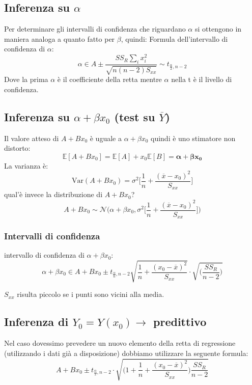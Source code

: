 \documentclass[]{article}
\newcommand{\ev}{\mathbb{E}[X]}
\renewcommand{\ev}[1]{\mathbb{E}\left[#1\right]}
\begin{document}
    \subsection{Inferenza su $\alpha$}
    Per determinare gli intervalli di confidenza che riguardano $\alpha$ si ottengono in maniera analoga a quanto fatto per $\beta$, quindi:
    Formula dell'intervallo di confidenza di $\alpha$:
    \[ \alpha \in A \pm \frac{SS_R\sum_{i}{}x_i^2}{\sqrt{n(n-2)S_{xx}}} \sim t_{\frac{\alpha}{2},n-2} \]
    Dove la prima $\alpha$ è il coefficiente della retta mentre $\alpha$ nella t è il livello di confidenza.
    \subsection{Inferenza su $\alpha + \beta x_0$ (test su $\overline{Y}$)}
    Il valore atteso di $A + B x_0$ è uguale a $\alpha + \beta x_0$  quindi è uno stimatore non distorto:
    \[ \ev{A +B x_0} = \ev{A} + x_0 \ev{B} = \boldsymbol{\alpha + \beta x_0} \]
    La varianza è:
    \[ \text{Var}(A+Bx_0) = \sigma^2 \Big[\frac{1}{n} + \frac{(\overline x - x_0)^2}{S_{xx}}  \Big] \]
    qual'è invece la distribuzione di $A+Bx_0$?
    \[ A+Bx_0 \sim \mathcal N \Big(\alpha+\beta x_0, \sigma^2 \Big[ \frac{1}{n} + \frac{(\overline x - x_0)^2}{S_{xx}} \Big]\Big) \]
    \subsubsection{Intervalli di confidenza}
    intervallo di confidenza di $\alpha + \beta x_0$:
    \[ \alpha + \beta x_0 \in A + B x_0 \pm t_{\frac{\alpha}{n}, n-2}\sqrt{\frac{1}{n} + \frac{(x_0- \overline x)^2}{S_{xx}}} \cdot \sqrt{\Big(\frac{SS_R}{n-2} \Big)} \]
    \centerline{$S_{xx}$ risulta piccolo se i punti sono vicini alla media.}
    \newpage
    \subsection{Inferenza di $Y_0 = Y(x_0) \rightarrow$ predittivo}
    Nel caso dovessimo prevedere un nuovo elemento della retta di regressione (utilizzando i dati già a disposizione) dobbiamo utilizzare la seguente formula:
    \[ A+Bx_0 \pm t_{\frac{\alpha}{2},n-2} \cdot \sqrt{\Big(1+\frac{1}{n} + \frac{(x_0-\overline x)^2}{S_{xx}}\Big)\frac{SS_R}{n-2}} \]
\end{document}
